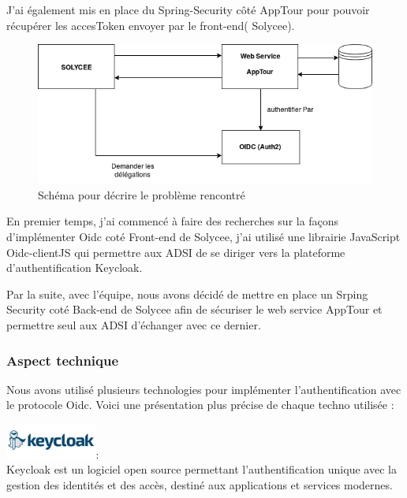 \documentclass[12pt]{article}
\begin{document}
J'ai également mis en place du Spring-Security côté AppTour pour pouvoir récupérer les accesToken envoyer par le front-end( Solycee). 

\begin{figure}[H]
	\centering
 		\includegraphics[width=1\textwidth]{diagrammes/schemaOIDC2.png}
  		\caption{Schéma pour décrire le problème rencontré}\end{figure}	


En premier temps, j'ai commencé à faire des recherches sur la façons d'implémenter Oidc coté Front-end de Solycee, j'ai utilisé une librairie JavaScript Oidc-clientJS qui permettre aux ADSI de se diriger vers la plateforme d'authentification Keycloak.

Par la suite, avec l'équipe, nous avons décidé de mettre en place un Srping Security coté Back-end de Solycee afin de sécuriser le web service AppTour et permettre seul aux ADSI d'échanger avec ce dernier.  
 
\subsubsection{Aspect technique}

Nous avons utilisé plusieurs technologies pour implémenter l'authentification avec le protocole Oidc. Voici une présentation plus précise de chaque techno utilisée : 

\includegraphics[width=30mm,scale=0.5]{diagrammes/logo_Keycloak.jpeg}: \\

Keycloak  est un logiciel open source permettant l'authentification unique avec la gestion des identités et des accès, destiné aux applications et services modernes. 
\end{document}
